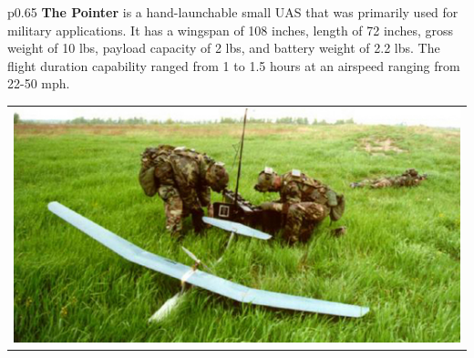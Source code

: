 \documentclass[]{article}
\begin{document}
\begin{table}[H]
\begin{minipage}[b]{0.65\linewidth}
\begin{tabular}{*{1}{p{0.65\textwidth}}}
{\bf The Pointer} is a hand-launchable small UAS that was primarily used for military applications.  It has a wingspan of 108 inches, length of 72 inches, gross weight of 10 lbs, payload capacity of 2 lbs, and battery weight of 2.2 lbs. The flight duration capability ranged from 1 to 1.5 hours at an airspeed ranging from 22-50 mph.
\end{tabular}
\end{minipage}
\hfill
\begin{minipage}[b]{0.5\linewidth}
\begin{tabular}{*{1}{p{}}}
\includegraphics[height=8\baselineskip]{pointeruav}
\end{tabular}
\end{minipage}
\end{table}
\end{document}
